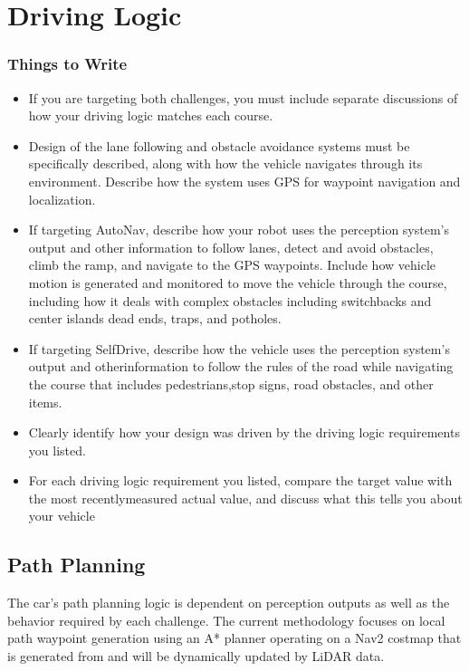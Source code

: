 \section{Driving Logic}
\subsubsection*{Things to Write}

\begin{itemize}
  \item If you are targeting both challenges, you must include separate discussions of how your driving logic matches each course.
  \item Design of the lane following and obstacle avoidance systems must be specifically described, along with how the vehicle navigates through its environment. Describe how the system uses GPS for waypoint navigation and localization.
  \item If targeting AutoNav, describe how your robot uses the perception system’s output and other information to follow lanes, detect and avoid obstacles, climb the ramp, and navigate to the GPS waypoints. Include how vehicle motion is generated and monitored to move the vehicle through the course, including how it deals with complex obstacles including switchbacks and center islands dead ends, traps, and potholes.
  \item If targeting SelfDrive, describe how the vehicle uses the perception system’s output and otherinformation to follow the rules of the road while navigating the course that includes pedestrians,stop signs, road obstacles, and other items.
  \item Clearly identify how your design was driven by the driving logic requirements you listed.
  \item For each driving logic requirement you listed, compare the target value with the most recentlymeasured actual value, and discuss what this tells you about your vehicle
\end{itemize}

\subsection*{Path Planning}

The car’s path planning logic is dependent on perception outputs as well as the behavior required by each challenge. The current methodology focuses on local path waypoint generation using an A* planner operating on a Nav2 costmap that is generated from and will be dynamically updated by LiDAR data.

